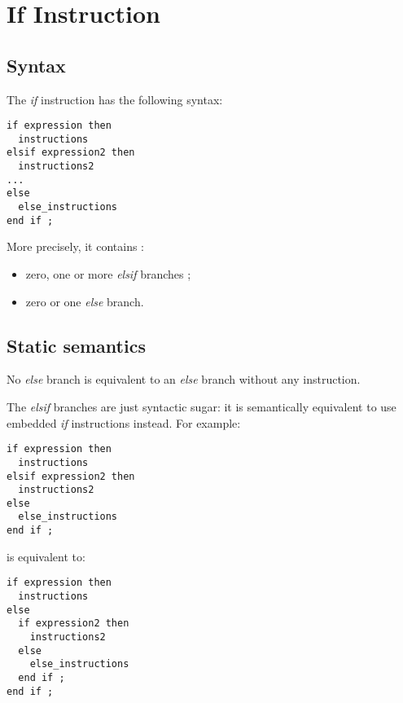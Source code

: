 









\section{If Instruction}


\subsection{Syntax}

The \emph{if} instruction has the following syntax:
{
\begin{lstlisting}[language=galgas]
if expression then
  instructions
elsif expression2 then
  instructions2
...
else
  else_instructions
end if ;  
\end{lstlisting}
}

More precisely, it contains :
\begin{itemize}
\item zero, one or more \emph{elsif} branches ;
\item zero or one \emph{else} branch.
\end{itemize}


\subsection{Static semantics}


No \emph{else} branch is equivalent to an \emph{else} branch without any instruction.


The \emph{elsif} branches are just syntactic sugar: it is semantically equivalent to use embedded \emph{if} instructions instead. For example:
{
\begin{lstlisting}[language=galgas]
if expression then
  instructions
elsif expression2 then
  instructions2
else
  else_instructions
end if ;  
\end{lstlisting}
}
is equivalent to:
{
\begin{lstlisting}[language=galgas]
if expression then
  instructions
else
  if expression2 then
    instructions2
  else
    else_instructions
  end if ;  
end if ;  
\end{lstlisting}
}

